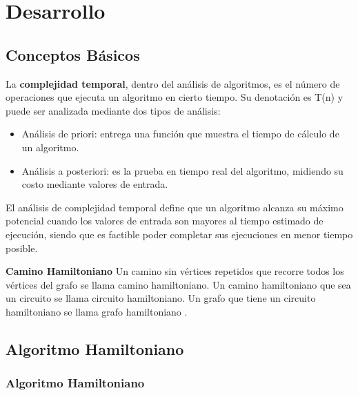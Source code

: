 \chapter{Desarrollo}

\section{Conceptos Básicos}
    La \textbf{complejidad temporal}, dentro del análisis de algoritmos, es el número de operaciones que ejecuta un algoritmo en cierto tiempo. Su denotación es T(n) y puede ser analizada mediante dos tipos de análisis:
    
    \begin{itemize}
        \item Análisis de priori: entrega una función que muestra el tiempo de cálculo de un algoritmo.
        \item Análisis a posteriori: es la prueba en tiempo real del algoritmo, midiendo su costo mediante valores de entrada. 
    \end{itemize}
    
    El análisis de complejidad temporal define que un algoritmo alcanza su máximo potencial cuando los valores de entrada son mayores al tiempo estimado de ejecución, siendo que es factible poder completar sus ejecuciones en menor tiempo posible. 
    
    \textbf{Camino Hamiltoniano} Un camino sin vértices repetidos que recorre todos los vértices del grafo se llama camino hamiltoniano. Un camino hamiltoniano que sea un circuito se llama circuito hamiltoniano. Un grafo que tiene un circuito hamiltoniano se llama grafo hamiltoniano \cite{Hamil}.

    
    
    
\newpage
\section{Algoritmo Hamiltoniano}
    \subsection{Algoritmo Hamiltoniano}
   
